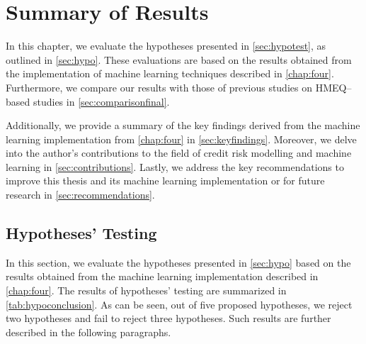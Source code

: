 \chapter{Summary of Results}
\label{chap:five}
In this chapter, we evaluate the hypotheses presented in \autoref{sec:hypotest}, as outlined in \autoref{sec:hypo}.
These evaluations are based on the results obtained from the implementation of machine learning techniques described in \autoref{chap:four}. 
Furthermore, we compare our results with those of previous studies on HMEQ--based studies \citep{serkan2021bagging,zurada2014classification} in \autoref{sec:comparisonfinal}.

Additionally, we provide a summary of the key findings derived from the machine learning implementation from \autoref{chap:four} in  \autoref{sec:keyfindings}. 
Moreover, we delve into the author's contributions to the field of credit risk modelling and machine learning in \autoref{sec:contributions}.
Lastly, we address the key recommendations to improve this thesis and its machine learning implementation or for future research in \autoref{sec:recommendations}.

\newpage
\section{Hypotheses' Testing}
\label{sec:hypotest}

In this section, we evaluate the hypotheses presented in \autoref{sec:hypo} based on the results obtained from the machine learning implementation described in \autoref{chap:four}. The results of hypotheses' testing are summarized in \autoref{tab:hypoconclusion}.
As can be seen, out of five proposed hypotheses, we reject two hypotheses and fail to reject three hypotheses. Such results are further described in the following paragraphs.

